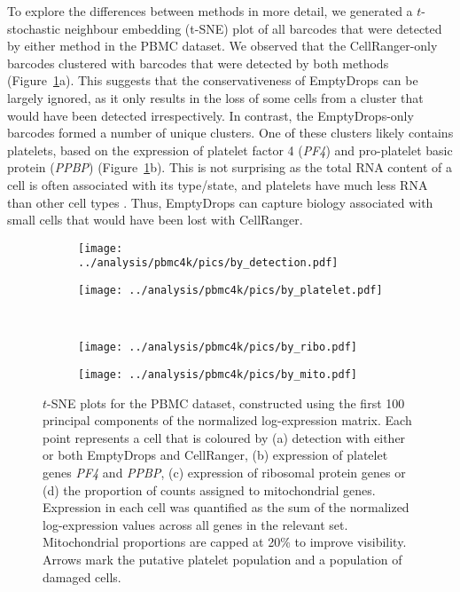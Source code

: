 \documentclass[10pt,letterpaper]{article}
\begin{document}
To explore the differences between methods in more detail, we generated a $t$-stochastic neighbour embedding (t-SNE) plot \cite{van2008visualizing} of all barcodes that were detected by either method in the PBMC dataset.
We observed that the CellRanger-only barcodes clustered with barcodes that were detected by both methods (Figure~\ref{fig:realtsne}a).
This suggests that the conservativeness of EmptyDrops can be largely ignored, as it only results in the loss of some cells from a cluster that would have been detected irrespectively.
In contrast, the EmptyDrops-only barcodes formed a number of unique clusters.
One of these clusters likely contains platelets, based on the expression of platelet factor 4 (\textit{PF4}) and pro-platelet basic protein (\textit{PPBP}) (Figure~\ref{fig:realtsne}b). 
This is not surprising as the total RNA content of a cell is often associated with its type/state, and platelets have much less RNA than other cell types \cite{rowley2012platelet}.
Thus, EmptyDrops can capture biology associated with small cells that would have been lost with CellRanger.

\begin{figure}[btp]
    \begin{subfigure}{0.49\textwidth}
        \texttt{[image: ../analysis/pbmc4k/pics/by\_detection.pdf]}
        \caption{}
    \end{subfigure}
    \begin{subfigure}{0.49\textwidth}
        \texttt{[image: ../analysis/pbmc4k/pics/by\_platelet.pdf]}
        \caption{}
    \end{subfigure} \\[0.05in]
    \begin{subfigure}{0.49\textwidth}
        \texttt{[image: ../analysis/pbmc4k/pics/by\_ribo.pdf]}
        \caption{}
    \end{subfigure}
    \begin{subfigure}{0.49\textwidth}
        \texttt{[image: ../analysis/pbmc4k/pics/by\_mito.pdf]}
        \caption{}
    \end{subfigure}
    \caption{$t$-SNE plots for the PBMC dataset, constructed using the first 100 principal components of the normalized log-expression matrix.
        Each point represents a cell that is coloured by (a) detection with either or both EmptyDrops and CellRanger, 
        (b) expression of platelet genes \textit{PF4} and \textit{PPBP}, (c) expression of ribosomal protein genes or (d) the proportion of counts assigned to mitochondrial genes.
        Expression in each cell was quantified as the sum of the normalized log-expression values across all genes in the relevant set.
        Mitochondrial proportions are capped at 20\% to improve visibility.
        Arrows mark the putative platelet population and a population of damaged cells.
    }
    \label{fig:realtsne}
\end{figure}
\end{document}
